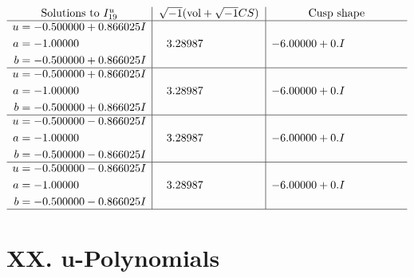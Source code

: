 \documentclass[1p]{elsarticle_modified}
\theoremstyle{definition}
\newcommand{\I}{\sqrt{-1}}
\begin{document}
$$\begin{array}{c|c|c}  
\text{Solutions to }I^u_{19}& \I (\text{vol} + \sqrt{-1}CS) & \text{Cusp shape}\\
 \hline 
\begin{aligned}
u &= -0.500000 + 0.866025 I \\
a &= -1.00000\phantom{ +0.000000I} \\
b &= -0.500000 + 0.866025 I\end{aligned}
 & \phantom{-}3.28987\phantom{ +0.000000I} & -6.00000 + 0. I\phantom{ +0.000000I} \\ \hline\begin{aligned}
u &= -0.500000 + 0.866025 I \\
a &= -1.00000\phantom{ +0.000000I} \\
b &= -0.500000 + 0.866025 I\end{aligned}
 & \phantom{-}3.28987\phantom{ +0.000000I} & -6.00000 + 0. I\phantom{ +0.000000I} \\ \hline\begin{aligned}
u &= -0.500000 - 0.866025 I \\
a &= -1.00000\phantom{ +0.000000I} \\
b &= -0.500000 - 0.866025 I\end{aligned}
 & \phantom{-}3.28987\phantom{ +0.000000I} & -6.00000 + 0. I\phantom{ +0.000000I} \\ \hline\begin{aligned}
u &= -0.500000 - 0.866025 I \\
a &= -1.00000\phantom{ +0.000000I} \\
b &= -0.500000 - 0.866025 I\end{aligned}
 & \phantom{-}3.28987\phantom{ +0.000000I} & -6.00000 + 0. I\phantom{ +0.000000I}\\
 \hline 
 \end{array}$$\newpage
\newpage\renewcommand{\arraystretch}{1}
\centering \section*{ XX. u-Polynomials}
\end{document}
